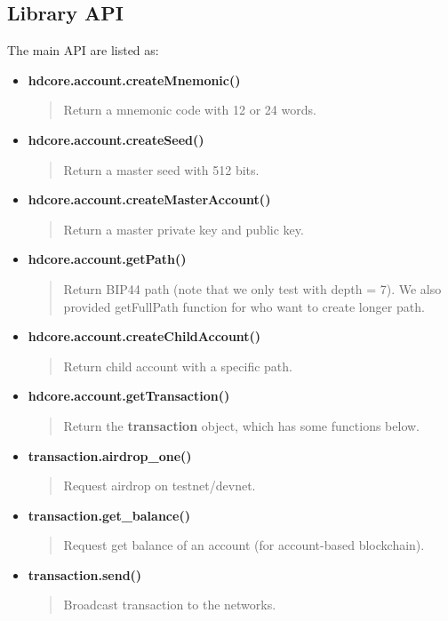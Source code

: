 \subsection{Library API}
\label{typeapi}
The main API are listed as:
\begin{itemize}
    \item \textbf{hdcore.account.createMnemonic()}
          \begin{quote}
              Return a mnemonic code with 12 or 24 words.
          \end{quote}

    \item \textbf{hdcore.account.createSeed()}
          \begin{quote}
              Return a master seed with 512 bits.
          \end{quote}

    \item \textbf{hdcore.account.createMasterAccount()}
          \begin{quote}
              Return a master private key and public key.
          \end{quote}

    \item \textbf{hdcore.account.getPath()}
          \begin{quote}
              Return BIP44 path (note that we only test with depth = 7). We also provided getFullPath function for who want to create longer path.
          \end{quote}

    \item \textbf{hdcore.account.createChildAccount()}
          \begin{quote}
              Return child account with a specific path.
          \end{quote}

    \item \textbf{hdcore.account.getTransaction()}
          \begin{quote}
              Return the \textbf{transaction} object, which has some functions below.
          \end{quote}

    \item \textbf{transaction.airdrop\_one()}
          \begin{quote}
              Request airdrop on testnet/devnet.
          \end{quote}

    \item \textbf{transaction.get\_balance()}
          \begin{quote}
              Request get balance of an account (for account-based blockchain).
          \end{quote}

    \item \textbf{transaction.send()}
          \begin{quote}
              Broadcast transaction to the networks.
          \end{quote}
\end{itemize}

